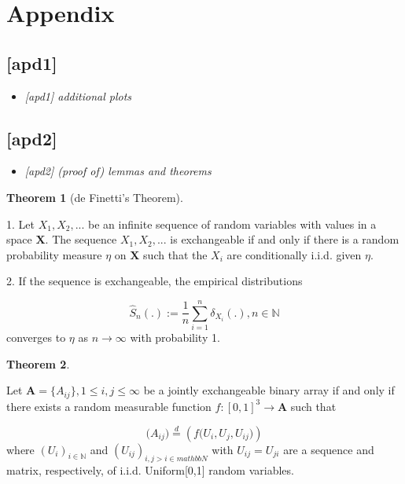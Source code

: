 \documentclass[12pt]{article}
\theoremstyle{definition}
\newtheorem{theorem}{Theorem}[section]
\begin{document}
\section{Appendix}

\subsection{[apd1]}
\begin{itemize}
	\item {\it  [apd1] additional plots   \/}
\end{itemize}


\subsection{[apd2]}
\begin{itemize}
	\item {\it  [apd2] (proof of) lemmas and theorems   \/}
\end{itemize}


\begin{theorem}[de Finetti's Theorem] 
\label{finetti}

1. Let $X_{1}, X_{2}, ...$ be an infinite sequence of random variables with values in a space $\mathbf{X}$. The sequence $X_{1}, X_{2}, ...$ is exchangeable if and only if there is a random probability measure $\eta$ on $\mathbf{X}$ such that the $X_{i}$ are conditionally i.i.d. given $\eta$. 

2. If the sequence is exchangeable, the empirical distributions

$$\hat{S}_{n} ( . ) := \frac{1}{n} \sum\limits_{i=1}^{n} \delta_{X_{i}} ( .), n \in \mathbb{N}$$
converges to $\eta$ as $n \rightarrow \infty$ with probability 1.
\end{theorem}

\begin{theorem}
	\label{Aldous_Hoover}

Let $\mathbf{A} = \{A_{ij}\}, 1 \leq i,j \leq \infty$ be a jointly exchangeable binary array if and only if there exists a random measurable function $f : [0,1]^{3} \rightarrow \mathbf{A}$ such that 

\begin{equation}
\big(  A_{ij}  \big) \stackrel{d}{=} \left( f \big( U_{i}, U_{j}, U_{ij} \big)  \right)
\end{equation}
where $(U_{i})_{i \in \mathbb{N}}$ and $(U_{ij})_{i,j > i \in mathbb{N}}$ with $U_{ij} = U_{ji}$ are a sequence and matrix, respectively, of i.i.d. Uniform[0,1] random variables. 
\end{theorem}
\end{document}
